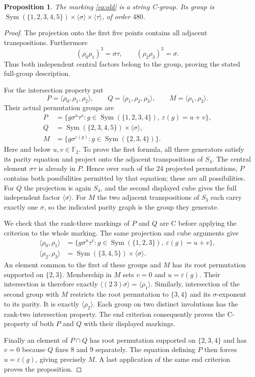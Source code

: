 \documentclass[11pt,a4paper]{article}
\newcommand{\Sym}{\operatorname{Sym}}\newcommand{\gen}[1]{\langle#1\rangle}
\newcommand{\eps}{\varepsilon}\newtheorem{proposition}{Proposition}
\begin{document}
\begin{proposition}\label{prop:old}
The marking \eqref{eq:old} is a string C-group. Its group is
$\Sym(\{1,2,3,4,5\})\times\gen{\sigma}\times\gen{\tau}$, of order $480$.
\end{proposition}
\begin{proof}
The projection onto the first five points contains all adjacent
transpositions. Furthermore
\[
 (\rho_0\rho_1)^3=\sigma\tau,\qquad
 (\rho_2\rho_3)^3=\sigma.
\]
Thus both independent central factors belong to the group, proving the
stated full-group description.

For the intersection property put
\[
 P=\gen{\rho_0,\rho_1,\rho_2},\qquad
 Q=\gen{\rho_1,\rho_2,\rho_3},\qquad
 M=\gen{\rho_1,\rho_2}.
\]
Their actual permutation groups are
\begin{align*}
 P&=\{g\sigma^u\tau^v:
       g\in\Sym(\{1,2,3,4\}),\ \eps(g)=u+v\},\\
 Q&=\Sym(\{2,3,4,5\})\times\gen{\sigma},\\
 M&=\{g\sigma^{\eps(g)}:g\in\Sym(\{2,3,4\})\}.
\end{align*}
Here and below $u,v\in\mathbb F_2$. To prove the first formula, all three
generators satisfy its parity equation and project onto the adjacent
transpositions of $S_4$. The central element $\sigma\tau$ is already in
$P$. Hence over each of the $24$ projected permutations, $P$ contains
both possibilities permitted by that equation; these are all possibilities.
For $Q$ the projection is again $S_4$, and the second displayed cube gives
the full independent factor $\gen{\sigma}$. For $M$ the two adjacent
transpositions of $S_3$ each carry exactly one $\sigma$, so the indicated
parity graph is the group they generate.

We check that the rank-three markings of $P$ and $Q$ are C before applying
the criterion to the whole marking. The same projection and cube arguments
give
\begin{align*}
 \gen{\rho_0,\rho_1}
 &=\{g\sigma^u\tau^v:
     g\in\Sym(\{1,2,3\}),\ \eps(g)=u+v\},\\
 \gen{\rho_2,\rho_3}
 &=\Sym(\{3,4,5\})\times\gen{\sigma}.
\end{align*}
An element common to the first of these groups and $M$ has its root
permutation supported on $\{2,3\}$. Membership in $M$ sets $v=0$
and $u=\eps(g)$. Their intersection is therefore exactly
$\gen{(2\ 3)\sigma}=\gen{\rho_1}$.
Similarly, intersection of the second group with $M$ restricts the root
permutation to $\{3,4\}$ and its $\sigma$-exponent to its parity.
It is exactly $\gen{\rho_2}$.
Each group on two distinct involutions has the rank-two intersection
property. The end criterion consequently proves the C-property of both
$P$ and $Q$ with their displayed markings.

Finally an element of $P\cap Q$ has root permutation supported on
$\{2,3,4\}$ and has $v=0$ because $Q$ fixes $8$ and $9$ separately.
The equation defining $P$ then forces $u=\eps(g)$, giving precisely $M$.
A last application of the same end criterion proves the proposition.
\end{proof}
\end{document}
